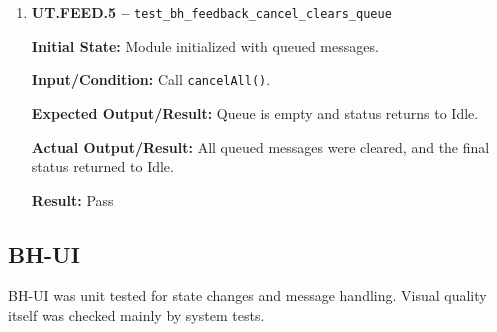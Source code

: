 \documentclass[12pt]{article}
\begin{document}
\begin{enumerate}
    \textbf{Input/Condition:} Call
    \texttt{speakNow("Done", VoiceOnly)}.
    
    \textbf{Expected Output/Result:} The expected failure path or
    exception is triggered.
    
    \textbf{Actual Output/Result:} The mocked TTS failure triggered
    the expected failure path, and the module did not remain stuck in a
    speaking state.
    
    \textbf{Result:} Pass
    
    \item \textbf{UT.FEED.5 --}
    \texttt{test\_bh\_feedback\_cancel\_clears\_queue}
    
    \textbf{Initial State:} Module initialized with queued messages.
    
    \textbf{Input/Condition:} Call \texttt{cancelAll()}.
    
    \textbf{Expected Output/Result:} Queue is empty and status
    returns to Idle.
    
    \textbf{Actual Output/Result:} All queued messages were cleared,
    and the final status returned to Idle.
    
    \textbf{Result:} Pass
\end{enumerate}

\subsection{BH-UI}

BH-UI was unit tested for state changes and message handling. Visual
quality itself was checked mainly by system tests.
\end{document}
